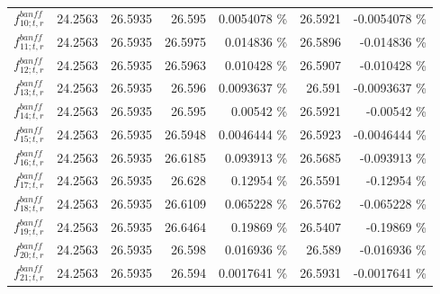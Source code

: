 \begin{table}
\begin{tabular}{| l | r | r | r  r | r  r |}
                                                          $f_{10; t, r}^{banff}$ &         24.2563 & 26.5935 & 26.595 &       0.0054078 \%  &         26.5921 &      -0.0054078 \%  \\ 
                                                          $f_{11; t, r}^{banff}$ &         24.2563 & 26.5935 & 26.5975 &        0.014836 \%  &         26.5896 &       -0.014836 \%  \\ 
                                                          $f_{12; t, r}^{banff}$ &         24.2563 & 26.5935 & 26.5963 &        0.010428 \%  &         26.5907 &       -0.010428 \%  \\ 
                                                          $f_{13; t, r}^{banff}$ &         24.2563 & 26.5935 & 26.596 &       0.0093637 \%  &          26.591 &      -0.0093637 \%  \\ 
                                                          $f_{14; t, r}^{banff}$ &         24.2563 & 26.5935 & 26.595 &         0.00542 \%  &         26.5921 &        -0.00542 \%  \\ 
                                                          $f_{15; t, r}^{banff}$ &         24.2563 & 26.5935 & 26.5948 &       0.0046444 \%  &         26.5923 &      -0.0046444 \%  \\ 
                                                          $f_{16; t, r}^{banff}$ &         24.2563 & 26.5935 & 26.6185 &        0.093913 \%  &         26.5685 &       -0.093913 \%  \\ 
                                                          $f_{17; t, r}^{banff}$ &         24.2563 & 26.5935 & 26.628 &         0.12954 \%  &         26.5591 &        -0.12954 \%  \\ 
                                                          $f_{18; t, r}^{banff}$ &         24.2563 & 26.5935 & 26.6109 &        0.065228 \%  &         26.5762 &       -0.065228 \%  \\ 
                                                          $f_{19; t, r}^{banff}$ &         24.2563 & 26.5935 & 26.6464 &         0.19869 \%  &         26.5407 &        -0.19869 \%  \\ 
                                                          $f_{20; t, r}^{banff}$ &         24.2563 & 26.5935 & 26.598 &        0.016936 \%  &          26.589 &       -0.016936 \%  \\ 
                                                          $f_{21; t, r}^{banff}$ &         24.2563 & 26.5935 & 26.594 &       0.0017641 \%  &         26.5931 &      -0.0017641 \%  \\ 

\end{tabular}
\end{table}
